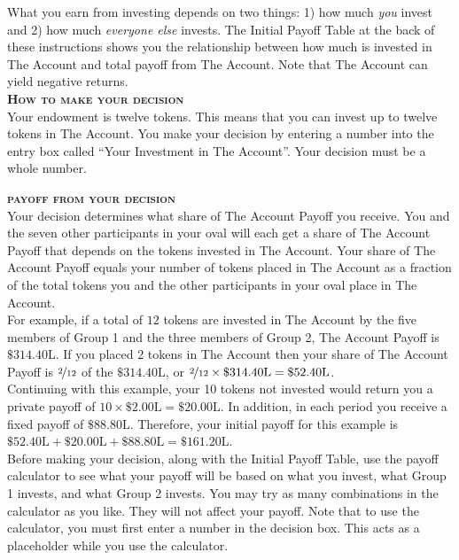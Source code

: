 \documentclass[12pt]{article}
\begin{document}
What you earn from investing depends on two things: 1) how much {\em you} invest and 2) how much {\em everyone else} invests.  The Initial Payoff Table at the back of these instructions shows you the relationship between how much is invested in The Account and total payoff from The Account. Note that The Account can yield negative returns.\\ 


{\bf \scshape How to make your decision}\\

Your endowment is twelve tokens.  This means that you can invest up to twelve tokens in The Account. You make your decision by entering a number into the entry box called ``Your Investment in The Account''. Your decision must be a whole number.\\ 

\newpage

{\bf \scshape payoff from your decision}\\

Your decision determines what share of The Account Payoff you receive.  You and the seven other participants in your oval will each get a share of The Account Payoff that depends on the tokens invested in The Account.  Your share of The Account Payoff equals your number of tokens placed in The Account as a fraction of the total tokens you and the other participants in your oval place in The Account.\\  

For example, if a total of $12$ tokens are invested in The Account by the five members of Group 1 and the three members of Group 2, The Account Payoff is $\$314.40\text{L}$.  If you placed 2 tokens in The Account then your share of The Account Payoff is $\nicefrac{2}{12}$ of the $\$314.40\text{L}$, or $\nicefrac{2}{12} \times \$314.40\text{L} = \$52.40\text{L}$.\\

Continuing with this example, your 10 tokens not invested would return you a private payoff of $10 \times \$2.00\text{L} = \$20.00\text{L}$. In addition, in each period you receive a fixed payoff of $\$88.80\text{L}$. Therefore, your initial payoff for this example is $\$52.40\text{L} + \$20.00\text{L} + \$88.80\text{L} = \$161.20\text{L}$.\\

Before making your decision, along with the Initial Payoff Table, use the payoff calculator to see what your payoff will be based on what you invest, what Group 1 invests, and what Group 2 invests. You may try as many combinations in the calculator as you like.  They will not affect your payoff. Note that to use the calculator, you must first enter a number in the decision box.  This acts as a placeholder while you use the calculator.\\ 
\end{document}

